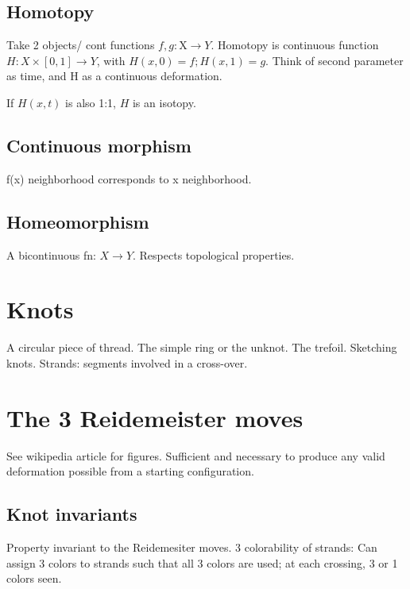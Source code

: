 \documentclass[oneside, article]{memoir}
\begin{document}
\subsection{Homotopy}
Take 2 objects/ cont functions $f, g: $X$ \to Y$. Homotopy is continuous function $H:X \times [0, 1] \to Y$, with $H(x, 0) = f; H(x, 1) = g$. Think of second parameter as time, and H as a continuous deformation.

If $H(x,t)$ is also 1:1, $H$ is an isotopy.

\subsection{Continuous morphism}
f(x) neighborhood corresponds to x neighborhood.

\subsection{Homeomorphism}
A bicontinuous fn: $X \to Y$. Respects topological properties.

\section{Knots}
A circular piece of thread. The simple ring or the unknot. The trefoil. Sketching knots. Strands: segments involved in a cross-over.

\section{The 3 Reidemeister moves}
See wikipedia article for figures. Sufficient and necessary to produce any valid deformation possible from a starting configuration.

\subsection{Knot invariants}
Property invariant to the Reidemesiter moves. 3 colorability of strands: Can assign 3 colors to strands such that all 3 colors are used; at each crossing, 3 or 1 colors seen.



\end{document}
